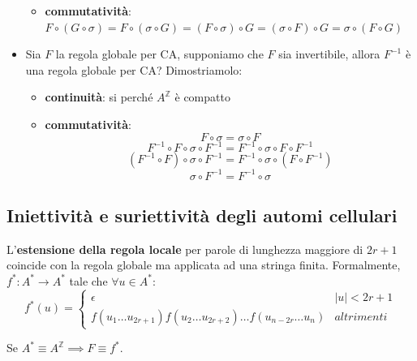 \begin{itemize}
\begin{itemize}
              \item \textbf{commutatività}: $F\circ (G\circ \sigma) = F\circ (\sigma\circ G) = (F\circ \sigma)\circ G =(\sigma\circ F)\circ G = \sigma\circ (F\circ G)$
          \end{itemize}
    \item Sia $F$ la regola globale per CA, supponiamo che $F$ sia invertibile,
          allora $F^{-1}$ è una regola globale per CA? Dimostriamolo:
          \begin{itemize}
              \item \textbf{continuità}: si perché $A^\mathbb{Z}$ è compatto
              \item \textbf{commutatività}: $$F\circ \sigma = \sigma \circ F $$
                    $$ F^{-1} \circ F\circ \sigma \circ F^{-1}= F^{-1}\circ \sigma \circ F \circ F^{-1}$$
                    $$ (F^{-1} \circ F)\circ \sigma \circ F^{-1}= F^{-1}\circ \sigma \circ (F \circ F^{-1})$$
                    $$ \sigma \circ F^{-1}= F^{-1}\circ \sigma$$
          \end{itemize}
\end{itemize}

\subsection{Iniettività e suriettività degli automi cellulari}

\begin{definizione} 
    L'\textbf{estensione della regola locale} per parole di lunghezza maggiore di
    $2r+1$ coincide con la regola globale ma
    applicata ad una stringa finita. Formalmente, $f^\ast: A^\ast\rightarrow A^\ast$
    tale che $\forall u\in A^\ast$:
    \begin{equation*}
        f^\ast(u) = \begin{cases}
            \epsilon                                                             & |u| < 2r+1 \\
            f(u_1\dots u_{2r+1})f(u_2\dots u_{2r+2})\dots f(u_{n-2r}\dots u_{n}) & altrimenti
        \end{cases}
    \end{equation*}
\end{definizione}

\begin{nota}
    Se $A^\ast\equiv A^\mathbb{Z}\implies F \equiv f^\ast$.
\end{nota}

